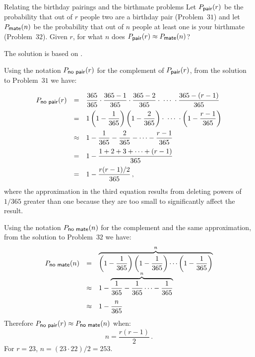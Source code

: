 
\begin{prob}{Relating the birthday pairings and the birthmate problems}
Let $P_{\textsf{\footnotesize pair}}(r)$ be the probability that out of $r$ people two are a birthday pair (Problem~$31$) and let $P_{\textsf{\footnotesize mate}}(n)$ be the probability that out of $n$ people at least one is your birthmate (Problem~$32$). Given $r$, for what $n$ does $P_{\textsf{\footnotesize pair}}(r) \approx P_{\textsf{\footnotesize mate}}(n)$?
\end{prob}


The solution is based on \cite{birthday}.

Using the notation $P_{\textsf{\footnotesize no pair}}(r)$ for the complement of $P_{\textsf{\footnotesize pair}}(r)$, from the solution to Problem~$31$ we have:
\[
\renewcommand*{\arraystretch}{2.2}
\begin{array}{lcl}
P_{\textsf{\footnotesize no pair}}(r)&=&
\disfrac{365}{365}\cdot 
  \frac{365-1}{365}\cdot \frac{365-2}{365} \cdot\;
  \cdots \;\cdot \frac{365-(r-1)}{365}\\
&=&1\left(1-\disfrac{1}{365}\right)
  \left(1-\disfrac{2}{365}\right) \cdot\;
  \cdots \;\cdot \left(1-\disfrac{r-1}{365}\right)\\
&\approx&1-\disfrac{1}{365} - \disfrac{2}{365} -
  \cdots - \disfrac{r-1}{365}\\
&=&1-\disfrac{1+2+3+\cdots + (r-1)}{365}\\
&=&1-\disfrac{r(r-1)/2}{365}\,,
\end{array}
\]
where the approximation in the third equation results from deleting powers of $1/365$ greater than one because they are too small to significantly affect the result.

Using the notation $P_{\textsf{\footnotesize no mate}}(n)$ for the complement and the same approximation, from the solution to Problem~$32$ we have:
\[
\renewcommand*{\arraystretch}{2.2}
\begin{array}{lcl}
P_{\textsf{\footnotesize no mate}}(n)
&=&\overbrace{\left(1-\frac{1}{365}\right)
  \left(1-\frac{1}{365}\right)\cdots
  \left(1-\frac{1}{365}\right)}^{n}\\
&\approx& 1-\overbrace{\frac{1}{365}-\frac{1}{365}\cdots-
  \frac{1}{365}}^{n}\\
&\approx& 1-\disfrac{n}{365}\\
\end{array}
\]
Therefore $P_{\textsf{\footnotesize no pair}}(r)\approx P_{\textsf{\footnotesize no mate}}(n)$ when:
\[
n=\frac{r(r-1)}{2}\,.
\]
For $r=23$, $n=(23\cdot 22)/2=253$.

